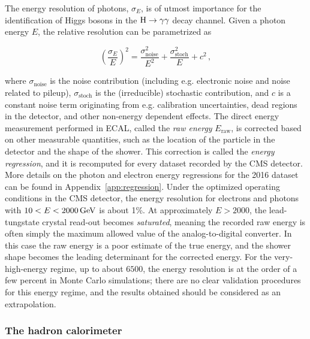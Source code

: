 The energy resolution of photons, $\sigma_E$, is of utmost importance for the identification of Higgs bosons in the $\mathrm{H}\to\mathrm{\gamma}\mathrm{\gamma}$ decay channel.
% 
Given a photon energy $E$, the relative resolution can be parametrized as~\cite{CMS:1997ysd}
% 
\begin{linenomath}
\begin{equation}
\left( \frac{\sigma_E}{E} \right)^2 =
    \frac{\sigma_\text{noise}^2}{E^2}
    + \frac{\sigma_\text{stoch}^2}{E}
    + c^2
\,,
\end{equation}
\end{linenomath}
% 
where $\sigma_\text{noise}$ is the noise contribution (including e.g. electronic noise and noise related to pileup), $\sigma_\text{stoch}$ is the (irreducible) stochastic contribution, and $c$ is a constant noise term originating from e.g. calibration uncertainties, dead regions in the detector, and other non-energy dependent effects.
% 
The direct energy measurement performed in ECAL, called the \textit{raw energy} $E_\text{raw}$, is corrected based on other measurable quantities, such as the location of the particle in the detector and the shape of the shower.
% 
This correction is called the \textit{energy regression}, and it is recomputed for every dataset recorded by the CMS detector.
% 
More details on the photon and electron energy regressions for the 2016 dataset can be found in Appendix~\ref{app:regression}.
% 
Under the optimized operating conditions in the CMS detector, the energy resolution for electrons and photons with $10 < E < 2000\,\text{GeV}$ is about 1\%.
% 
At approximately $E > 2000$\GeV, the lead-tungstate crystal read-out becomes \textit{saturated}, meaning the recorded raw energy is often simply the maximum allowed value of the analog-to-digital converter.
% 
In this case the raw energy is a poor estimate of the true energy, and the shower shape becomes the leading determinant for the corrected energy.
% 
For the very-high-energy regime, up to about $6500$\GeV, the energy resolution is at the order of a few percent in Monte Carlo simulations; there are no clear validation procedures for this energy regime, and the results obtained should be considered as an extrapolation.


\subsubsection{The hadron calorimeter}

